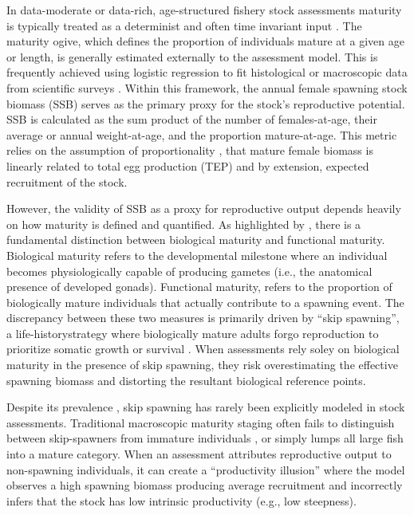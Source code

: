 \documentclass[
  authoryear,
  preprint,
  3p]{elsarticle}
\begin{document}
In data-moderate or data-rich, age-structured fishery stock assessments
maturity is typically treated as a determinist and often time invariant
input \citep{Miller2018}. The maturity ogive, which defines the
proportion of individuals mature at a given age or length, is generally
estimated externally to the assessment model. This is frequently
achieved using logistic regression to fit histological or macroscopic
data from scientific surveys \citep{Williams2016}. Within this
framework, the annual female spawning stock biomass (SSB) serves as the
primary proxy for the stock's reproductive potential. SSB is calculated
as the sum product of the number of females-at-age, their average or
annual weight-at-age, and the proportion mature-at-age. This metric
relies on the assumption of proportionality
\citep{Morgan2008, Lambert2008}, that mature female biomass is linearly
related to total egg production (TEP) and by extension, expected
recruitment of the stock.

However, the validity of SSB as a proxy for reproductive output depends
heavily on how maturity is defined and quantified. As highlighted by
\citet{Head2020}, there is a fundamental distinction between biological
maturity and functional maturity. Biological maturity refers to the
developmental milestone where an individual becomes physiologically
capable of producing gametes (i.e., the anatomical presence of developed
gonads). Functional maturity, refers to the proportion of biologically
mature individuals that actually contribute to a spawning event. The
discrepancy between these two measures is primarily driven by ``skip
spawning'', a life-historystrategy where biologically mature adults
forgo reproduction to prioritize somatic growth or survival
\citep{Jorgensen2006, Secor2008}. When assessments rely soley on
biological maturity in the presence of skip spawning, they risk
overestimating the effective spawning biomass and distorting the
resultant biological reference points.

Despite its prevalence \citep{Jorgensen2006, Secor2008, Rideout2011},
skip spawning has rarely been explicitly modeled in stock assessments.
Traditional macroscopic maturity staging often fails to distinguish
between skip-spawners from immature individuals
\citep{Rodgveller2018, McBride2022}, or simply lumps all large fish into
a mature category. When an assessment attributes reproductive output to
non-spawning individuals, it can create a ``productivity illusion''
where the model observes a high spawning biomass producing average
recruitment and incorrectly infers that the stock has low intrinsic
productivity (e.g., low steepness).
\end{document}

